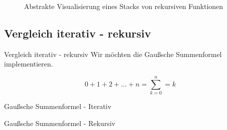 \documentclass{../tuda-beamer}
\begin{document}
  \begin{frame}[c]
    \begin{figure}[h]
      \centering
      \caption{Abstrakte Visualisierung eines Stacks von rekursiven Funktionen}
    \end{figure}
  \end{frame}

  \subsection{Vergleich iterativ - rekursiv}
  \begin{frame}{Vergleich iterativ - rekursiv}
    Wir möchten die Gaußsche Summenformel implementieren.

    \begin{equation}
      0 + 1 + 2 + ... + n = \sum_{k = 0}^n = k
    \end{equation}
  \end{frame}

  \begin{frame}{Gaußsche Summenformel - Iterativ}
    
  \end{frame}

  \begin{frame}{Gaußsche Summenformel - Rekursiv}
    
  \end{frame}
\end{document}
